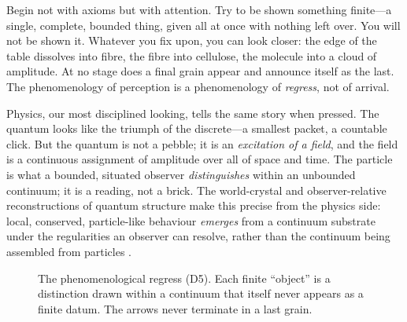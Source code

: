 \documentclass[]{article}
\theoremstyle{definition}
\theoremstyle{remark}
\begin{document}
Begin not with axioms but with attention. Try to be shown something finite---a
single, complete, bounded thing, given all at once with nothing left over. You
will not be shown it. Whatever you fix upon, you can look closer: the edge of the
table dissolves into fibre, the fibre into cellulose, the molecule into a cloud
of amplitude. At no stage does a final grain appear and announce itself as the
last. The phenomenology of perception is a phenomenology of \emph{regress}, not of
arrival.

Physics, our most disciplined looking, tells the same story when pressed. The
quantum looks like the triumph of the discrete---a smallest packet, a countable
click. But the quantum is not a pebble; it is an \emph{excitation of a field},
and the field is a continuous assignment of amplitude over all of space and time.
The particle is what a bounded, situated observer \emph{distinguishes} within an
unbounded continuum; it is a reading, not a brick. The world-crystal and
observer-relative reconstructions of quantum structure make this precise from the
physics side: local, conserved, particle-like behaviour \emph{emerges} from a
continuum substrate under the regularities an observer can resolve, rather than
the continuum being assembled from particles \cite{GoertzelWorldCrystal,
GoertzelObserverRelative}.

\begin{figure}[H]
\centering
{}
\caption{The phenomenological regress (D5). Each finite ``object'' is a distinction
drawn within a continuum that itself never appears as a finite datum. The arrows
never terminate in a last grain.}
\label{fig:regress}
\end{figure}
\end{document}
